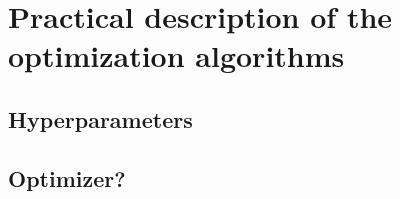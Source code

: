 \chapter{Practical description of the optimization algorithms}

\section{Hyperparameters}

\section{Optimizer?}
